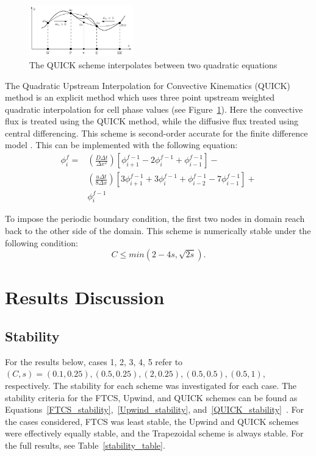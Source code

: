 \documentclass[twocolumn,10pt]{asme2ej}
\begin{document}
\begin{figure}[tbh]
\begin{center}
\includegraphics[width=0.4\textwidth]{figure/QUICK.png}
\caption{The QUICK scheme interpolates between two quadratic equations \cite{analytic_citation}}
\label{QUICK_scheme}
\end{center}
\end{figure}

The Quadratic Upstream Interpolation for Convective Kinematics (QUICK) method is an explicit method which uses three point upstream weighted quadratic interpolation for cell phase values (see Figure~\ref{QUICK_scheme}). Here the convective flux is treated using the QUICK method, while the diffusive flux treated using central differencing. This scheme is second-order accurate for the finite difference model \cite{chen1992advection}. This can be implemented with the following equation:
\begin{equation}
\label{quick_eqn}
\begin{split}
\phi_i ^f = & \left( \frac{D \Delta t}{\Delta x^2} \right) \left[ \phi_{i+1} ^{f-1} - 2 \phi_{i} ^{f-1} + \phi_{i-1} ^{f-1} \right] - \\
            & \left( \frac{u \Delta t}{8 \Delta x} \right) \left[ 3 \phi_{i+1} ^{f-1}  + 3 \phi_{i} ^{f-1}  + \phi_{i-2} ^{f-1} - 7 \phi_{i-1} ^{f-1} \right] + \\
            & \phi_i ^{f-1}
\end{split}
\end{equation}

To impose the periodic boundary condition, the first two nodes in domain reach back to the other side of the domain. This scheme is numerically stable under the following condition:
\begin{equation}
\label{QUICK_stability}
C \leq min(2 - 4 s, \sqrt{2s}).
\end{equation}

\section{Results Discussion}
\subsection{Stability}
For the results below, cases 1, 2, 3, 4, 5 refer to $(C, s) = (0.1, 0.25), (0.5, 0.25), (2, 0.25), (0.5, 0.5), (0.5, 1)$, respectively. The stability for each scheme was investigated for each case. The stability criteria for the FTCS, Upwind, and QUICK schemes can be found as Equations~\ref{FTCS_stability},~\ref{Upwind_stability}, and~\ref{QUICK_stability}~\cite{LectureA}. For the cases considered, FTCS was least stable, the Upwind and QUICK schemes were effectively equally stable, and the Trapezoidal scheme is always stable. For the full results, see Table~\ref{stability_table}.
\end{document}
